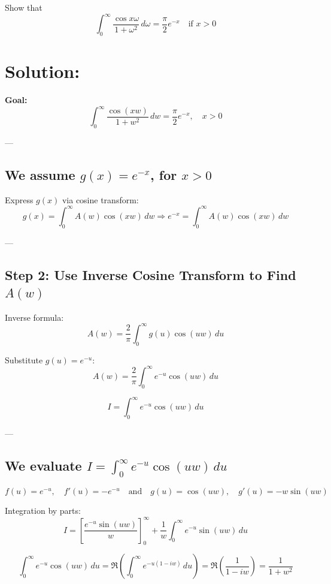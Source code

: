 \documentclass{article}
\begin{document}
\noindent
Show that
\[
\int_0^{\infty} \frac{\cos x\omega}{1 + \omega^2} \, d\omega = \frac{\pi}{2} e^{-x} \quad \text{if } x > 0
\]

\vspace{0.5cm}

\section*{Solution:}

\textbf{Goal:}
\[
\boxed{
\int_0^\infty \frac{\cos(xw)}{1 + w^2} \, dw = \frac{\pi}{2} e^{-x}, \quad x > 0
}
\]

---

\subsection*{We assume \( g(x) = e^{-x} \), for \( x > 0 \)}

Express \( g(x) \) via cosine transform:
\[
g(x) = \int_0^\infty A(w) \cos(xw) \, dw
\Rightarrow
e^{-x} = \int_0^\infty A(w) \cos(xw) \, dw
\]

---

\subsection*{Step 2: Use Inverse Cosine Transform to Find \( A(w) \)}

Inverse formula:
\[
A(w) = \frac{2}{\pi} \int_0^\infty g(u) \cos(uw) \, du
\]

Substitute \( g(u) = e^{-u} \):
\[
A(w) = \frac{2}{\pi} \int_0^\infty e^{-u} \cos(uw) \, du
\]

\[
I = \int_0^\infty e^{-u} \cos(uw) \, du
\]

---

\subsection*{We evaluate \( I = \int_0^\infty e^{-u} \cos(uw) \, du \)}

\[
f(u) = e^{-u}, \quad f'(u) = -e^{-u}
\quad \text{and} \quad
g(u) = \cos(uw), \quad g'(u) = -w \sin(uw)
\]

Integration by parts:
\[
I = \left[ \frac{e^{-u} \sin(uw)}{w} \right]_0^\infty + \frac{1}{w} \int_0^\infty e^{-u} \sin(uw) \, du
\]

\[
\int_0^\infty e^{-u} \cos(uw) \, du = \Re\left( \int_0^\infty e^{-u(1 - iw)} \, du \right)
= \Re\left( \frac{1}{1 - iw} \right)
= \frac{1}{1 + w^2}
\]
\end{document}
